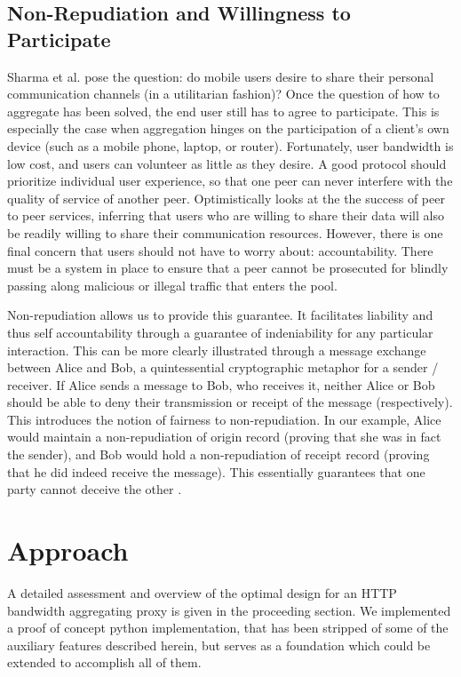 \documentclass[12pt]{article}
\begin{document}
\subsection{Non-Repudiation and Willingness to Participate}

	Sharma et al. pose the question: do mobile users desire to share their personal communication channels (in a utilitarian fashion)? Once the question of how to aggregate has been solved, the end user still has to agree to participate. This is especially the case when aggregation hinges on the participation of a client's own device (such as a mobile phone, laptop, or router). Fortunately, user bandwidth is low cost, and users can volunteer as little as they desire. A good protocol should prioritize individual user experience, so that one peer can never interfere with the quality of service of another peer. \cite{1363842} Optimistically looks at the the success of peer to peer services, inferring that users who are willing to share their data will also be readily willing to share their communication resources. However, there is one final concern that users should not have to worry about: accountability. There must be a system in place to ensure that a peer cannot be prosecuted for blindly passing along malicious or illegal traffic that enters the pool.

	Non-repudiation allows us to provide this guarantee. It facilitates liability and thus self accountability through a guarantee of indeniability for any particular interaction. This can be more clearly illustrated through a message exchange between Alice and Bob, a quintessential cryptographic metaphor for a sender / receiver. If Alice sends a message to Bob, who receives it, neither Alice or Bob should be able to deny their transmission or receipt of the message (respectively). This introduces the notion of fairness to non-repudiation. In our example, Alice would maintain a non-repudiation of origin record (proving that she was in fact the sender), and Bob would hold a non-repudiation of receipt record (proving that he did indeed receive the message). This essentially guarantees that one party cannot deceive the other \cite{Kremer20021606}.

\newpage
\section{Approach}

	A detailed assessment and overview of the optimal design for an HTTP bandwidth aggregating proxy is given in the proceeding section. We implemented a proof of concept python implementation, that has been stripped of some of the auxiliary features described herein, but serves as a foundation which could be extended to accomplish all of them.
\end{document}
